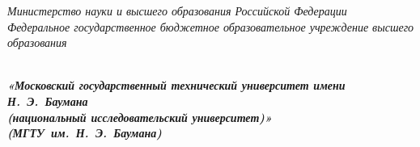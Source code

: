 
\begin{titlepage}
\thispagestyle{empty}

{\large
\begin{center}
	\textsl{Министерство науки и высшего образования Российской Федерации \\ Федеральное государственное бюджетное образовательное учреждение высшего образования}
	\vspace{2em}
\end{center}
}
{
\begin{minipage}[t]{0.13\textwidth}
	\centering{}
	\label{fig0}
	\end{minipage}\hfill
\begin{minipage}[t]{0.65\textwidth}
	\begin{center}
		\large  \textsl{\textbf {\\ «Московский государственный технический университет имени Н.~Э.~Баумана \\ (национальный исследовательский университет)» \\ (МГТУ~им.~Н.~Э.~Баумана)}}
	\end{center}
\end{minipage}
}


\end{titlepage}
